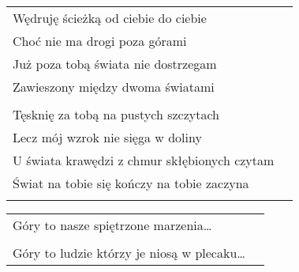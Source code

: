 \documentclass[a5paper]{article}
\begin{document}
\noindent
\begin{tabular}{@{}p{7.50cm}p{3cm}@{}}
Wędruję ścieżką od ciebie do ciebie \\
Choć nie ma drogi poza górami \\
Już poza tobą świata nie dostrzegam \\
Zawieszony między dwoma światami \\ \\

Tęsknię za tobą na pustych szczytach \\
Lecz mój wzrok nie sięga w doliny \\
U świata krawędzi z chmur skłębionych czytam \\
Świat na tobie się kończy na tobie zaczyna \\ \\
\end{tabular}

\noindent
\begin{tabular}{@{}p{6.50cm}p{3cm}@{}}
Góry to nasze spiętrzone marzenia… \\ \\ 
Góry to ludzie którzy je niosą w plecaku…
\end{tabular}
\end{document}
